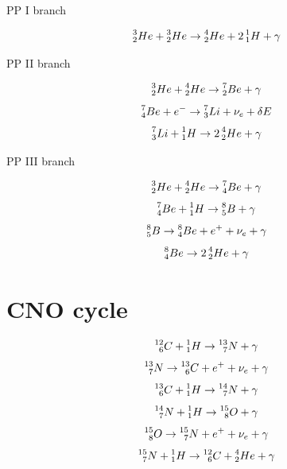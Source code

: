 \documentclass[a4paper,10pt,english]{article}
\newcommand{\Hh}{\prescript{1}{1}{H}}
\newcommand{\He}{\prescript{3}{2}{He}}
\begin{document}
PP I branch

$$\He + \He \rightarrow \prescript{4}{2}{He} + 2 \Hh + \gamma$$

PP II branch

$$\He + \prescript{4}{2}{He} \rightarrow \prescript{7}{2}{Be} + \gamma $$
$$\prescript{7}{4}{Be} + e^- \rightarrow \prescript{7}{3}{Li} + \nu_e + \delta E$$
$$\prescript{7}{3}{Li} + \Hh \rightarrow 2\prescript{4}{2}{He} + \gamma $$

PP III branch

$$\He + \prescript{4}{2}{He} \rightarrow \prescript{7}{4}{Be} + \gamma $$
$$\prescript{7}{4}{Be} + \Hh \rightarrow \prescript{8}{5}{B} + \gamma$$
$$\prescript{8}{5}{B} \rightarrow \prescript{8}{4}{Be} + e^+ + \nu_e + \gamma$$
$$\prescript{8}{4}{Be} \rightarrow 2\prescript{4}{2}{He} + \gamma $$

\section{CNO cycle} \label{appendix:CNO}

$$\prescript{12}{6}{C} + \Hh \rightarrow \prescript{13}{7}{N} + \gamma $$
$$\prescript{13}{7}{N} \rightarrow \prescript{13}{6}{C} + e^+ + \nu_e + \gamma$$
$$\prescript{13}{6}{C} + \Hh \rightarrow \prescript{14}{7}{N} + \gamma $$
$$\prescript{14}{7}{N} + \Hh \rightarrow \prescript{15}{8}{O} + \gamma $$
$$\prescript{15}{8}{O} \rightarrow \prescript{15}{7}{N} + e^+ + \nu_e + \gamma$$
$$\prescript{15}{7}{N} + \Hh \rightarrow \prescript{12}{6}{C} + \prescript{4}{2}{He} + \gamma $$

\printbibliography
\end{document}
